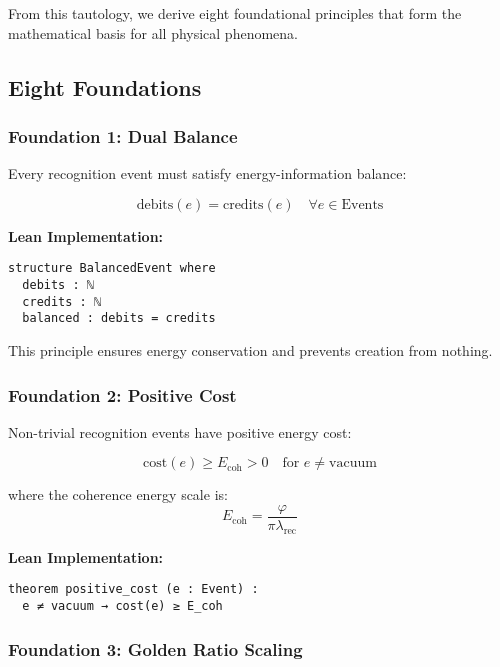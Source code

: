 \documentclass[11pt]{amsart}
\newcommand{\Ecoh}{E_{\text{coh}}}
\newcommand{\lambdarec}{\lambda_{\text{rec}}}
\begin{document}
From this tautology, we derive eight foundational principles that form the mathematical basis for all physical phenomena.

\subsection{Eight Foundations}

\subsubsection{Foundation 1: Dual Balance}

Every recognition event must satisfy energy-information balance:

\begin{equation}
\text{debits}(e) = \text{credits}(e) \quad \forall e \in \text{Events}
\end{equation}

\textbf{Lean Implementation:}
\begin{lstlisting}
structure BalancedEvent where
  debits : ℕ
  credits : ℕ  
  balanced : debits = credits
\end{lstlisting}

This principle ensures energy conservation and prevents creation from nothing.

\subsubsection{Foundation 2: Positive Cost}

Non-trivial recognition events have positive energy cost:

\begin{equation}
\text{cost}(e) \geq \Ecoh > 0 \quad \text{for } e \neq \text{vacuum}
\end{equation}

where the coherence energy scale is:
\begin{equation}
\Ecoh = \frac{\varphi}{\pi \lambdarec}
\end{equation}

\textbf{Lean Implementation:}
\begin{lstlisting}
theorem positive_cost (e : Event) : 
  e ≠ vacuum → cost(e) ≥ E_coh
\end{lstlisting}

\subsubsection{Foundation 3: Golden Ratio Scaling}
\end{document}
